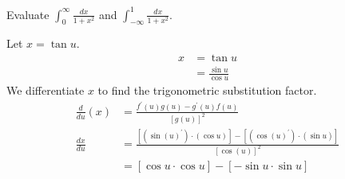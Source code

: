 \begin{exercise}
	Evaluate ${\displaystyle\int_0^{\infty}\frac{dx}{1+x^2}}$ and ${\displaystyle\int_{-\infty}^{1}\frac{dx}{1+x^2}}$.
\end{exercise}
\begin{solution}[1]
	Let $x = \tan u$.
	\begin{align*}
	x &= \tan u \\
	&= \frac{\sin u}{\cos u}
	\end{align*}
	We differentiate $x$ to find the trigonometric substitution factor.
	\begin{align*}
	\frac{d}{du}\left(x\right)&=\frac{f^{\prime}(u)g(u)-g^{\prime}(u)f(u)}{\left[g(u)\right]^2}\\
	\frac{dx}{du}&=\frac{\left[\left(\sin\left(u\right)^{\prime}\right)\cdot\left(\cos u\right)\right]-\left[\left(\cos\left(u\right)^{\prime}\right)\cdot\left(\sin u\right)\right]}{\left[\cos\left(u\right)\right]^2}\\
	&=\left[\cos u \cdot \cos u\right]-\left[-\sin u \cdot \sin u\right]
	\end{align*}
\end{solution}